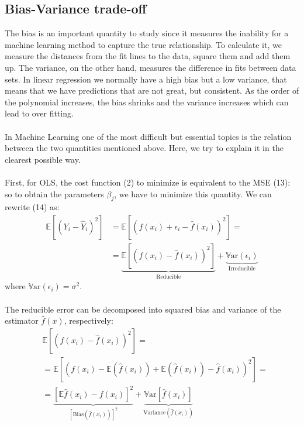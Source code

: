 \documentclass{emulateapj}
\begin{document}
\subsection{Bias-Variance trade-off}
The bias is an important quantity to study since it measures the inability for a machine learning method to capture the true relationship. To calculate it, we measure the distances from the fit lines to the data, square them and add them up.
The variance, on the other hand, measures the difference in fits between data sets. 
In linear regression we normally have a high bias but a low variance, that means that we have predictions that are not great, but consistent.
As the order of the polynomial increases, the bias shrinks and the variance increases which can lead to over fitting.
\\
\\In Machine Learning one of the most difficult but essential topics is the relation between the two quantities mentioned above. Here, we try to explain it in the clearest possible way.
\\
\\First, for OLS, the cost function (2) to minimize is equivalent to the MSE (13): so to obtain the parameters $\beta_j$, we have to minimize this quantity. We can rewrite (14) as:
\begin{equation}
\begin{split}
\mathbb{E}[(Y_{i} - \hat{Y}_i)^2] &= \mathbb{E}[(f(x_i) + \epsilon_i -  \hat{f}(x_i))^2] =\\&=\underbrace{\mathbb{E}[(f(x_i)  -  \hat{f}(x_i))^2]}_{\mathrm{Reducible}} + \underbrace{\mathbb{V}\mathrm{ar}(\epsilon_i)}_{\mathrm{Irreducible}}
\end{split}
\end{equation} 
where $\mathbb{V}\mathrm{ar}(\epsilon_i)=\sigma^2$. \\
\\
The reducible error can be decomposed into squared bias and variance of the estimator $\hat{f}(x)$, respectively:
\begin{equation}
\begin{split}
&\mathbb{E}[(f(x_i)  -  \hat{f}(x_i))^2]  = \\&=\mathbb{E}[(f(x_i)  - \mathbb{E}(\hat{f}(x_i)) + \mathbb{E}(\hat{f}(x_i)) - \hat{f}(x_i))^2]=
\\&=\underbrace{ [\mathbb{E}\hat{f}(x_i) - f(x_i) ]^2}_{[\mathrm{Bias}(\hat{f}(x_i))]^2} + \underbrace{\mathbb{V}\mathrm{ar}[\hat{f}(x_i)]}_{\mathrm{Variance}(\hat{f}(x_i))}
\end{split}
\end{equation}
\end{document}
